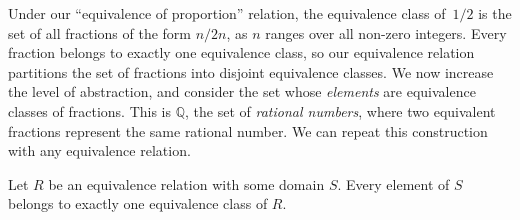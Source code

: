 \documentclass[../generics]{subfiles}
\begin{document}
Under our ``equivalence of proportion'' relation, the equivalence class of~$1/2$ is the set of all fractions of the form $n/2n$, as $n$ ranges over all non-zero integers. Every fraction belongs to exactly one equivalence class, so our equivalence relation partitions the set of fractions into disjoint equivalence classes. We now increase the level of abstraction, and consider the set whose \emph{elements} are equivalence classes of fractions. This is $\mathbb{Q}$, the set of \emph{rational numbers}, where two equivalent fractions represent the same rational number. We can repeat this construction with any equivalence relation.

\begin{proposition}
Let $R$ be an equivalence relation with some domain $S$. Every element of $S$ belongs to exactly one equivalence class of $R$.
\end{proposition}
\end{document}
